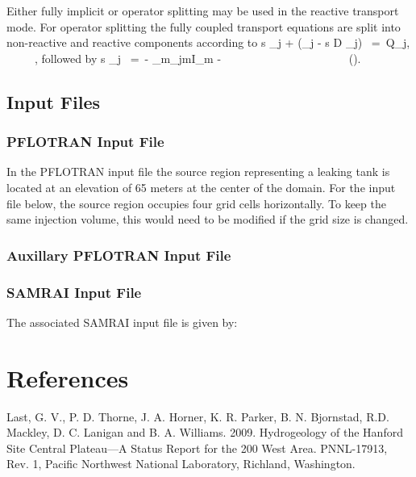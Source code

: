 \documentclass[12pt]{article}
\def\EQ#1\EN{\begin{equation}#1\end{equation}}
\newcommand{\eq}{\ =\ }
\newcommand{\p}{{\partial}}
\newcommand{\bnabla}{\boldsymbol{\nabla}}
\newcommand{\bq}{\boldsymbol{q}}
\begin{document}
Either fully implicit or operator splitting may be used in the reactive transport mode. For operator splitting the fully coupled transport equations are split into non-reactive and reactive components according to
\EQ
\frac{\p}{\p t} \varphi s \Psi_j + \bnabla\cdot\big(\bq \Psi_j - \varphi s D \bnabla \Psi_j\big) \eq Q_j, \ \ \ \ \ ,
\EN
followed by
\EQ
\frac{d}{dt} \varphi s \Psi_j \eq - \sum_m\nu_{jm}I_m -  \ \ \ \ \ \ \ \ \ \ \ \ \ \ \ \ \ \ \ \ \ \ ().
\EN

\subsection{Input Files}

\subsubsection{PFLOTRAN Input File}

In the PFLOTRAN input file the source region representing a leaking tank is located at an elevation of 65 meters at the center of the domain. For the input file below, the source region occupies four grid cells horizontally. To keep the same injection volume, this would need to be modified if the grid size is changed.

\tiny

\normalsize

\subsubsection{Auxillary PFLOTRAN Input File}

\tiny

\normalsize

\subsubsection{SAMRAI Input File}

The associated SAMRAI input file is given by:

\tiny
%
\normalsize

\section{References}

Last, G. V., P. D. Thorne, J. A. Horner, K. R. Parker, B. N. Bjornstad, R.D. Mackley, D. C. Lanigan and B. A. Williams. 2009. Hydrogeology of the Hanford Site Central Plateau---A Status Report for the 200 West Area. PNNL-17913, Rev. 1, Pacific Northwest National Laboratory, Richland, Washington.
\end{document}
